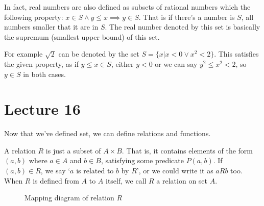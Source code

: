 \documentclass[a4paper,10pt]{article}
\theoremstyle{definition} %
\begin{document}
    In fact, real numbers are also defined as subsets of rational numbers which the following
    property: $x \in S \land y \leq x \implies y \in S$. That is if there's a number is $S$, all
    numbers smaller that it are in $S$. The real number denoted by this set is basically the supremum
    (smallest upper bound) of this set.

    For example $\sqrt{2}$ can be denoted by the set $S = \{x| x<0 \lor x^2 < 2\}$. This satisfies
    the given property, as if $y \leq x \in S$, either $y < 0$ or we can say
    $y^2 \leq x^2 < 2$, so $y \in S$ in both cases.
    
    \newpage
    \section{Lecture 16}
    
    Now that we've defined set, we can define relations and functions.

    A relation $R$ is just a subset of $A \times B$. That is, it contains elements of 
    the form $(a,b)$ where $a \in A$ and $b \in B$, satisfying some predicate $P(a,b)$.
    If $(a,b) \in R$, we say `$a$ is related to $b$ by $R$', or we could write it as $aRb$
    too. When $R$ is defined from $A$ to $A$ itself, we call $R$ a relation on set $A$.

    \begin{figure}[ht]
    \centering
    \caption{Mapping diagram of relation $R$}
    \end{figure}
\end{document}

